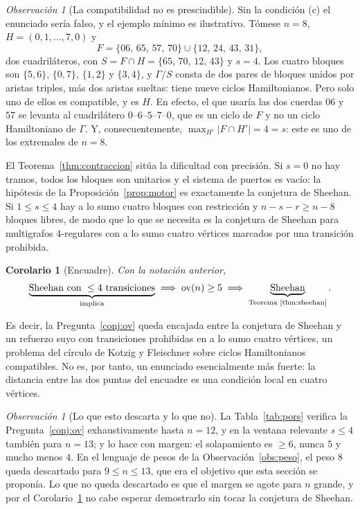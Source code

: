 \documentclass[11pt,a4paper]{article}
\newtheorem{corolario}[teorema]{Corolario}
\theoremstyle{definition}
\theoremstyle{remark}
\newtheorem{observacion}[teorema]{Observación}
\begin{document}
\begin{observacion}[La compatibilidad no es prescindible]\label{obs:puertos}
Sin la condición (c) el enunciado sería falso, y el ejemplo mínimo es ilustrativo. Tómese $n=8$, $H=(0,1,\dots,7,0)$ y
\[
F=\{06,\,65,\,57,\,70\}\cup\{12,\,24,\,43,\,31\},
\]
dos cuadriláteros, con $S=F\cap H=\{65,\,70,\,12,\,43\}$ y $s=4$. Los cuatro bloques son $\{5,6\}$, $\{0,7\}$, $\{1,2\}$ y $\{3,4\}$, y $\Gamma/S$ consta de dos pares de bloques unidos por aristas triples, más dos aristas sueltas: tiene nueve ciclos Hamiltonianos. Pero solo uno de ellos es compatible, y es $H$. En efecto, el que usaría las dos cuerdas $06$ y $57$ se levanta al cuadrilátero $0$--$6$--$5$--$7$--$0$, que es un ciclo de $F$ y no un ciclo Hamiltoniano de $\Gamma$. Y, consecuentemente, $\max_{H'}|F\cap H'|=4=s$: este es uno de los extremales de $n=8$.
\end{observacion}

El Teorema~\ref{thm:contraccion} sitúa la dificultad con precisión. Si $s=0$ no hay tramos, todos los bloques son unitarios y el sistema de puertos es vacío: la hipótesis de la Proposición~\ref{prop:motor} es exactamente la conjetura de Sheehan. Si $1\le s\le4$ hay a lo sumo cuatro bloques con restricción y $n-s-r\ge n-8$ bloques libres, de modo que lo que se necesita es la conjetura de Sheehan para multigrafos $4$-regulares con a lo sumo cuatro vértices marcados por una transición prohibida.

\begin{corolario}[Encuadre]\label{cor:encuadre}
Con la notación anterior,
\[
\underbrace{\text{Sheehan con }\le4\text{ transiciones}}_{\text{implica}}
\;\Longrightarrow\;
\mathrm{ov}(n)\ge5
\;\Longrightarrow\;
\underbrace{\text{Sheehan}}_{\text{Teorema~\ref{thm:sheehan}}} .
\]
\end{corolario}

Es decir, la Pregunta~\ref{conj:ov} queda encajada entre la conjetura de Sheehan y un refuerzo suyo con transiciones prohibidas en a lo sumo cuatro vértices, un problema del círculo de Kotzig y Fleischner sobre ciclos Hamiltonianos compatibles. No es, por tanto, un enunciado esencialmente más fuerte: la distancia entre las dos puntas del encuadre es una condición local en cuatro vértices.

\begin{observacion}[Lo que esto descarta y lo que no]
La Tabla~\ref{tab:pors} verifica la Pregunta~\ref{conj:ov} exhaustivamente hasta $n=12$, y en la ventana relevante $s\le4$ también para $n=13$; y lo hace con margen: el solapamiento es $\ge6$, nunca $5$ y mucho menos $4$. En el lenguaje de pesos de la Observación~\ref{obs:peso}, el peso $8$ queda descartado para $9\le n\le13$, que era el objetivo que esta sección se proponía. Lo que no queda descartado es que el margen se agote para $n$ grande, y por el Corolario~\ref{cor:encuadre} no cabe esperar demostrarlo sin tocar la conjetura de Sheehan.
\end{observacion}
\end{document}
